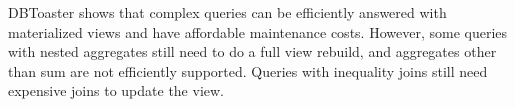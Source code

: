 DBToaster shows that complex queries can be efficiently answered with materialized views and have affordable maintenance costs.
However, some queries with nested aggregates still need to do a full view rebuild, and aggregates other than sum are not efficiently supported. %
Queries with inequality joins still need expensive joins to update the view.



%




